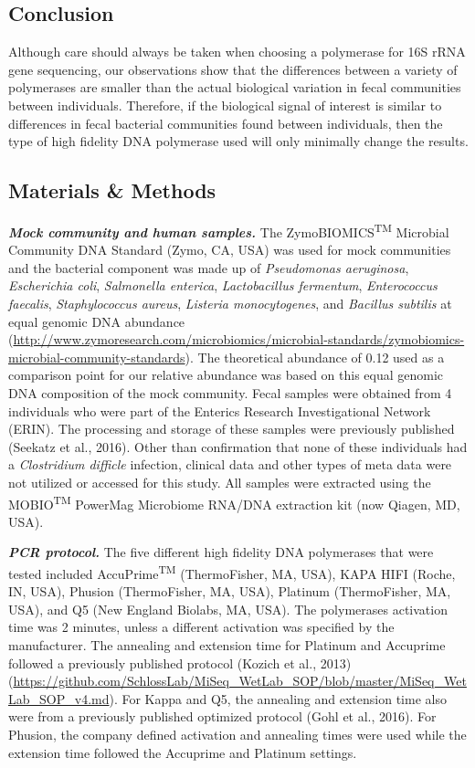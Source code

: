 \documentclass[11pt,]{article}
\begin{document}
\newpage

\subsection{Conclusion}\label{conclusion}

Although care should always be taken when choosing a polymerase for 16S
rRNA gene sequencing, our observations show that the differences between
a variety of polymerases are smaller than the actual biological
variation in fecal communities between individuals. Therefore, if the
biological signal of interest is similar to differences in fecal
bacterial communities found between individuals, then the type of high
fidelity DNA polymerase used will only minimally change the results.

\newpage

\subsection{Materials \& Methods}\label{materials-methods}

\textbf{\emph{Mock community and human samples.}} The
ZymoBIOMICS\textsuperscript{TM} Microbial Community DNA Standard (Zymo,
CA, USA) was used for mock communities and the bacterial component was
made up of \emph{Pseudomonas aeruginosa}, \emph{Escherichia coli},
\emph{Salmonella enterica}, \emph{Lactobacillus fermentum},
\emph{Enterococcus faecalis}, \emph{Staphylococcus aureus},
\emph{Listeria monocytogenes}, and \emph{Bacillus subtilis} at equal
genomic DNA abundance
(\url{http://www.zymoresearch.com/microbiomics/microbial-standards/zymobiomics-microbial-community-standards}).
The theoretical abundance of 0.12 used as a comparison point for our
relative abundance was based on this equal genomic DNA composition of
the mock community. Fecal samples were obtained from 4 individuals who
were part of the Enterics Research Investigational Network (ERIN). The
processing and storage of these samples were previously published
(Seekatz et al., 2016). Other than confirmation that none of these
individuals had a \emph{Clostridium difficle} infection, clinical data
and other types of meta data were not utilized or accessed for this
study. All samples were extracted using the MOBIO\textsuperscript{TM}
PowerMag Microbiome RNA/DNA extraction kit (now Qiagen, MD, USA).

\textbf{\emph{PCR protocol.}} The five different high fidelity DNA
polymerases that were tested included AccuPrime\textsuperscript{TM}
(ThermoFisher, MA, USA), KAPA HIFI (Roche, IN, USA), Phusion
(ThermoFisher, MA, USA), Platinum (ThermoFisher, MA, USA), and Q5 (New
England Biolabs, MA, USA). The polymerases activation time was 2
minutes, unless a different activation was specified by the
manufacturer. The annealing and extension time for Platinum and
Accuprime followed a previously published protocol (Kozich et al., 2013)
(\url{https://github.com/SchlossLab/MiSeq_WetLab_SOP/blob/master/MiSeq_WetLab_SOP_v4.md}).
For Kappa and Q5, the annealing and extension time also were from a
previously published optimized protocol (Gohl et al., 2016). For
Phusion, the company defined activation and annealing times were used
while the extension time followed the Accuprime and Platinum settings.
\end{document}
